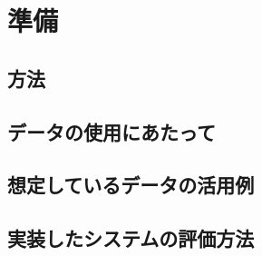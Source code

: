 \chapter{準備}

\section{方法}

\section{データの使用にあたって}

\section{想定しているデータの活用例}

\section{実装したシステムの評価方法}
